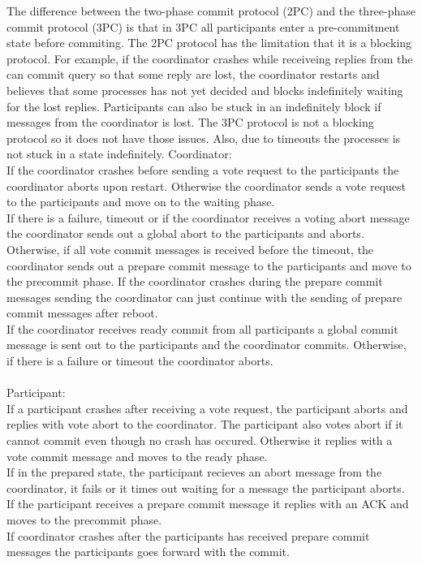 \documentclass[a4paper]{article}
\newcommand{\solution}[2][]{
  \ifthenelse{\equal{#1}{} \or \equal{#1}{a}}{\\[3pt]\textit{Solution: }\\[0.1cm]}{}
  \parbox[t]{\textwidth}{
    \ifthenelse{\equal{#1}{}}{}{#1)}
    \parbox[t]{0.95\textwidth}{#2}}\\
}
\begin{document}
%
\solution{
  The difference between the two-phase commit protocol (2PC)
  and the three-phase commit protocol (3PC) is that in 3PC all
  participants enter a pre-commitment state before commiting.
  The 2PC protocol has the limitation that it is a blocking
  protocol. For example, if the coordinator crashes while
  receiveing replies from the can commit query so that some reply
  are lost, the coordinator restarts and believes that some processes
  has not yet decided and blocks indefinitely waiting for the lost
  replies. Participants can also be stuck in an indefinitely block
  if messages from the coordinator is lost.
  The 3PC protocol is not a blocking protocol so it does not have
  those issues. Also, due to timeouts the processes is not stuck in
  a state indefinitely.
\usebox{\userinput}
  Coordinator:\\
  If the coordinator crashes before sending a vote request to the
  participants the coordinator aborts upon restart. Otherwise the
  coordinator sends a vote request to the participants and move
  on to the waiting phase.\\
  If there is a failure, timeout or if the coordinator receives a
  voting abort message the coordinator sends out a global abort to
  the participants and aborts. Otherwise, if all vote commit messages
  is received before the timeout, the coordinator sends out a prepare
  commit message to the participants and move to the precommit phase.
  If the coordinator crashes during the prepare commit messages sending
  the coordinator can just continue with the sending of prepare commit
  messages after reboot.\\
  If the coordinator receives ready commit from all participants a global
  commit message is sent out to the participants and the coordinator
  commits. Otherwise, if there is a failure or timeout the coordinator
  aborts. \\\\
  Participant:\\
  If a participant crashes after receiving a vote request, the
  participant aborts and replies with vote abort to the coordinator.
  The participant also votes abort if it cannot commit even though
  no crash has occured. Otherwise it replies with a vote commit message
  and moves to the ready phase. \\
  If in the prepared state, the participant recieves an abort message
  from the coordinator, it fails or it times out waiting for a message
  the participant aborts. If the participant receives a prepare commit
  message it replies with an ACK and moves to the precommit phase. \\
  If coordinator crashes after the participants has received prepare
  commit messages the participants goes forward with the commit.
}
\end{document}
